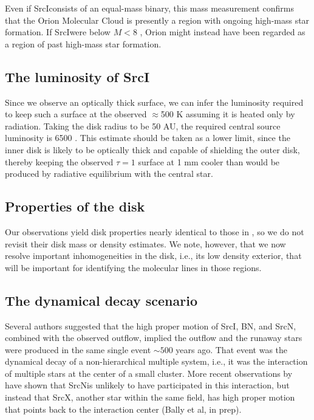 \documentclass[twocolumn]{aastex61}
\newcommand{\sourcei}{SrcI}
\newcommand{\sourcen}{SrcN}
\newcommand{\sourcex}{SrcX}
\begin{document}
Even if \sourcei consists of an equal-mass binary, this mass measurement
confirms that the Orion Molecular Cloud is presently a region with ongoing
high-mass star formation.  If \sourcei were below $M<8$ \msun, Orion might
instead have been regarded as a
region of past high-mass star formation.

\subsection{The luminosity of \sourcei}
Since we observe an optically thick surface, we can infer the luminosity
required to keep such a surface at the observed $\approx$500 K assuming
it is heated only by radiation.  Taking the disk radius to be 50 AU,
the required central source luminosity is 6500 \lsun.  This estimate
should be taken as a lower limit, since the inner disk is likely to be
optically thick and capable of shielding the outer disk, thereby
keeping the observed $\tau=1$ surface at 1 mm cooler than would
be produced by radiative equilibrium with the central star.

\subsection{Properties of the disk}
Our observations yield disk properties nearly identical to those in
\citet{Plambeck2016a}, so we do not revisit their disk mass or density
estimates.  We note, however, that we now resolve important inhomogeneities in
the disk, i.e., its low density exterior, that will be important for
identifying the molecular lines in those regions.

\subsection{The dynamical decay scenario}
Several authors \citep[][]{Gomez2008a,Goddi2011b,Bally2011a} suggested that
the high proper
motion of \sourcei, BN, and \sourcen, combined with the observed \hh outflow,
implied the outflow and the runaway stars were produced in the same single
event $\sim500$ years ago.  That event was the dynamical decay of a
non-hierarchical multiple system, i.e., it was the interaction of multiple
stars at the center of a small cluster.  More recent observations by
\citet{Luhman2017a} have shown that \sourcen is unlikely to have participated
in this interaction, but instead that \sourcex, another star within the same
field, has high proper motion that points back to the interaction center (Bally et al,
in prep).
\end{document}
